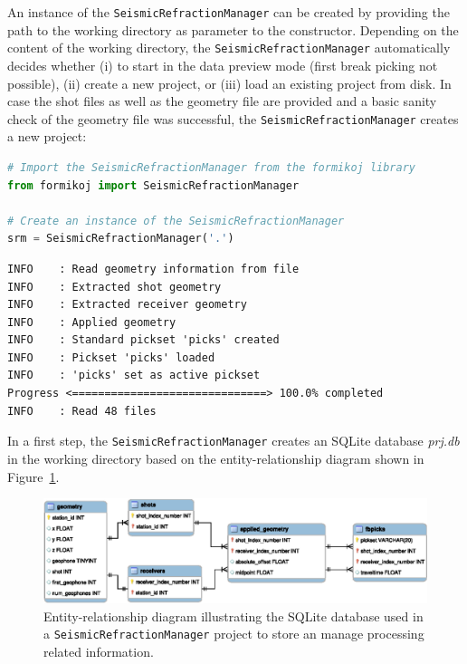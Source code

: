 \documentclass[a4paper,fleqn]{cas-sc}
\begin{document}
An instance of the \texttt{SeismicRefractionManager} can be created by providing the path to the working directory as parameter to the constructor. Depending on the content of the working directory, the \texttt{SeismicRefractionManager} automatically decides whether (i) to start in the data preview mode (first break picking not possible), (ii) create a new project, or (iii) load an existing project from disk.
In case the shot files as well as the geometry file are provided and a basic sanity check of the geometry file was successful, the \texttt{SeismicRefractionManager} creates a new project:
\begin{lstlisting}[language=Python, firstnumber=1]
# Import the SeismicRefractionManager from the formikoj library
from formikoj import SeismicRefractionManager

# Create an instance of the SeismicRefractionManager
srm = SeismicRefractionManager('.')
\end{lstlisting}
\begin{footnotesize}
\begin{verbatim}
INFO    : Read geometry information from file
INFO    : Extracted shot geometry
INFO    : Extracted receiver geometry
INFO    : Applied geometry
INFO    : Standard pickset 'picks' created
INFO    : Pickset 'picks' loaded
INFO    : 'picks' set as active pickset
Progress <==============================> 100.0% completed
INFO    : Read 48 files
\end{verbatim}
\end{footnotesize}
In a first step, the \texttt{SeismicRefractionManager} creates an SQLite database \textit{prj.db} in the working directory based on the entity-relationship diagram shown in Figure~\ref{fig:database}.
\begin{figure}
	\centering
	\includegraphics[width=.75\textwidth]{figures/srm_erd.eps}
	\caption{Entity-relationship diagram illustrating the SQLite database used in a \texttt{SeismicRefractionManager} project to store an manage processing related information.}
	\label{fig:database}
\end{figure}
\end{document}
